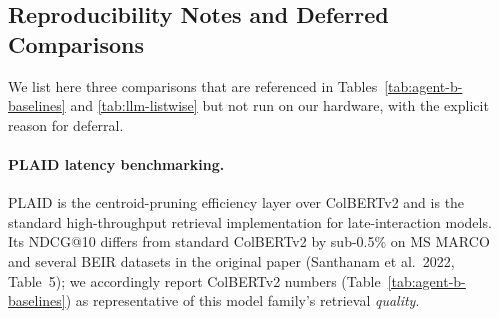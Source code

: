\documentclass[review,1p]{elsarticle}
\begin{document}
\subsection{Reproducibility Notes and Deferred Comparisons}
\label{subsec:reproducibility-notes}

We list here three comparisons that are referenced in Tables~\ref{tab:agent-b-baselines} and \ref{tab:llm-listwise} but not run on our hardware, with the explicit reason for deferral.

\paragraph{PLAID latency benchmarking.} PLAID \citep{santhanam2022plaid} is the centroid-pruning efficiency layer over ColBERTv2 and is the standard high-throughput retrieval implementation for late-interaction models. Its NDCG@10 differs from standard ColBERTv2 by sub-0.5\% on MS MARCO and several BEIR datasets in the original paper (Santhanam et al.\ 2022, Table~5); we accordingly report ColBERTv2 numbers (Table~\ref{tab:agent-b-baselines}) as representative of this model family's retrieval \emph{quality}.
\end{document}
